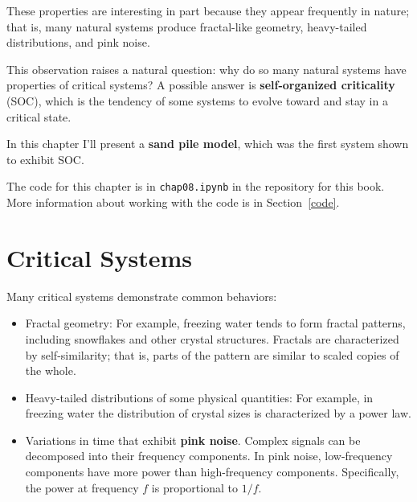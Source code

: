 \documentclass[12pt]{book}
\theoremstyle{exercise}
\begin{document}
These properties are interesting in part because they appear
frequently in nature; that is, many natural systems produce 
fractal-like geometry, heavy-tailed distributions, and pink noise.

This observation raises a natural question: why do so many natural
systems have properties of critical systems?  A possible answer is
{\bf self-organized criticality} (SOC), which is the tendency of some
systems to evolve toward and stay in a critical state.

In this chapter I'll present a {\bf sand pile model}, which was the
first system shown to exhibit SOC.

The code for this chapter is in {\tt chap08.ipynb} in the repository
for this book.  More information about working with the code is
in Section~\ref{code}.


\section{Critical Systems}

Many critical systems demonstrate common behaviors:

\begin{itemize}

\item Fractal geometry: For example, freezing water tends to form
  fractal patterns, including snowflakes and other crystal
  structures.  Fractals are characterized by self-similarity; that is,
  parts of the pattern are similar to scaled copies of the whole.


\item Heavy-tailed distributions of some physical quantities: For
  example, in freezing water the distribution of crystal sizes is
  characterized by a power law.


\item Variations in time that exhibit {\bf pink noise}.  Complex
  signals can be decomposed into their frequency components.  In pink
  noise, low-frequency components have more power than high-frequency
  components.  Specifically, the power at frequency $f$ is
  proportional to $1/f$.


\end{itemize}
\end{document}
